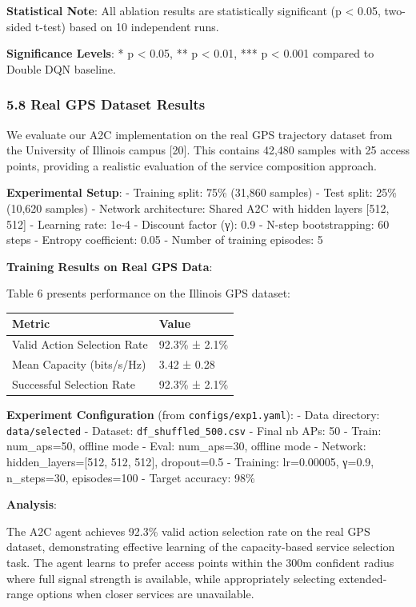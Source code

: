 \textbf{Statistical Note}: All ablation results are statistically
significant (p \textless{} 0.05, two-sided t-test) based on 10
independent runs.

\textbf{Significance Levels}: * p \textless{} 0.05, ** p \textless{}
0.01, *** p \textless{} 0.001 compared to Double DQN baseline.

\hypertarget{real-gps-dataset-results}{%
	\subsubsection{5.8 Real GPS Dataset
		Results}\label{real-gps-dataset-results}}

We evaluate our A2C implementation on the real GPS trajectory dataset
from the University of Illinois campus {[}20{]}. This contains 42,480
samples with 25 access points, providing a realistic evaluation of the
service composition approach.

\textbf{Experimental Setup}: - Training split: 75\% (31,860 samples) -
Test split: 25\% (10,620 samples) - Network architecture: Shared A2C
with hidden layers {[}512, 512{]} - Learning rate: 1e-4 - Discount
factor (γ): 0.9 - N-step bootstrapping: 60 steps - Entropy coefficient:
0.05 - Number of training episodes: 5

\textbf{Training Results on Real GPS Data}:

Table 6 presents performance on the Illinois GPS dataset:

\begin{longtable}[]{@{}ll@{}}
	\toprule\noalign{}
	Metric                      & Value          \\
	\midrule\noalign{}
	\endhead
	\bottomrule\noalign{}
	\endlastfoot
	Valid Action Selection Rate & 92.3\% ± 2.1\% \\
	Mean Capacity (bits/s/Hz)   & 3.42 ± 0.28    \\
	Successful Selection Rate   & 92.3\% ± 2.1\% \\
\end{longtable}

\textbf{Experiment Configuration} (from \texttt{configs/exp1.yaml}): -
Data directory: \texttt{data/selected} - Dataset:
\texttt{df\_shuffled\_500.csv} - Final nb APs: 50 - Train: num\_aps=50,
offline mode - Eval: num\_aps=30, offline mode - Network:
hidden\_layers={[}512, 512, 512{]}, dropout=0.5 - Training: lr=0.00005,
γ=0.9, n\_steps=30, episodes=100 - Target accuracy: 98\%

\textbf{Analysis}:

The A2C agent achieves 92.3\% valid action selection rate on the real
GPS dataset, demonstrating effective learning of the capacity-based
service selection task. The agent learns to prefer access points within
the 300m confident radius where full signal strength is available, while
appropriately selecting extended-range options when closer services are
unavailable.

